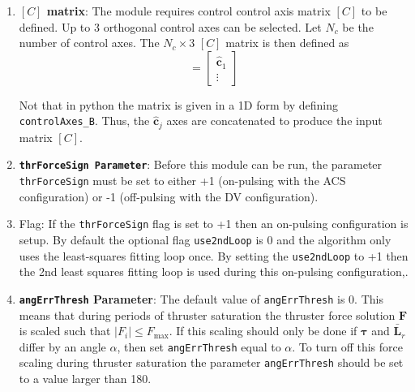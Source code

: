 \begin{enumerate}
\item \textbf{$[C]$ matrix}: The module requires control control axis matrix $[C]$ to be defined.  Up to 3 orthogonal control axes can be selected.  Let $N_{c}$ be the number of control axes.  The $N_{c}\times 3$ $[C]$ matrix is then defined as
\begin{equation}
	[C] = \begin{bmatrix}
		\hat{\bm c}_{1}
		\\
		\vdots
	\end{bmatrix}
\end{equation}

Not that in python the matrix is given in a 1D form by defining {\tt controlAxes\_B}.  Thus, the $\hat{\bm c}_{j}$ axes are concatenated to produce the input matrix $[C]$. 

\item \textbf{\tt thrForceSign Parameter}: Before this module can be run, the parameter {\tt thrForceSign} must be set to either +1 (on-pulsing with the ACS configuration) or -1 (off-pulsing with the DV configuration).

\item {} Flag: If the  {\tt thrForceSign} flag is set to +1 then an on-pulsing configuration is setup.  By default the optional flag  {\tt use2ndLoop} is 0 and the algorithm  only uses the least-squares fitting loop once.  By setting the {\tt use2ndLoop} to +1 then the 2nd least squares fitting loop is used during this on-pulsing configuration,. 

\item \textbf{{\tt angErrThresh} Parameter}: The default value of {\tt angErrThresh} is 0\dg.  This means that during periods of thruster saturation the thruster force solution $\bm F$ is scaled such that $|F_{i}| \le F_{\text{max}}$.  If this scaling should only be done if $\bm\tau$ and $\bar{\bm L}_{r}$ differ by an angle $\alpha$, then set {\tt angErrThresh} equal to $\alpha$.  To turn off this force scaling during thruster saturation the parameter   {\tt angErrThresh} should be set to a value larger than 180\dg.  

\end{enumerate}